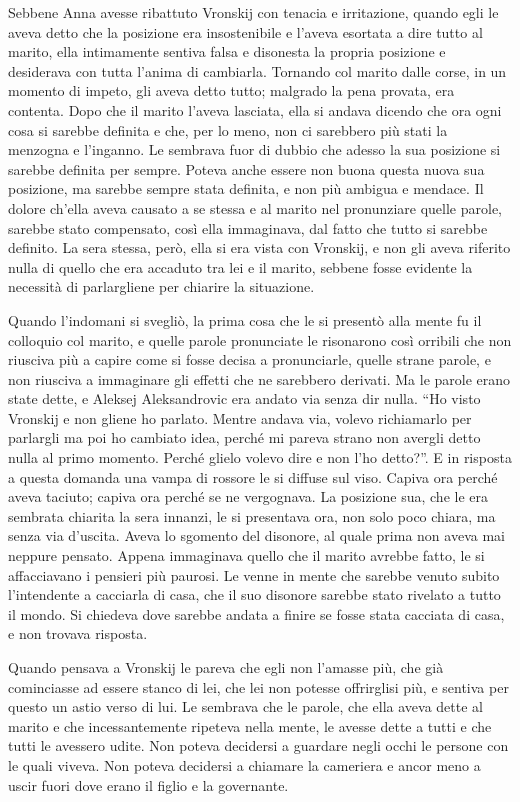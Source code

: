 Sebbene Anna avesse ribattuto Vronskij con tenacia e irritazione, quando egli le aveva detto che la posizione era insostenibile e l'aveva esortata a dire tutto al marito, ella intimamente sentiva falsa e disonesta la propria posizione e desiderava con tutta l'anima di cambiarla. Tornando col marito dalle corse, in un momento di impeto, gli aveva detto tutto; malgrado la pena provata, era contenta. Dopo che il marito l'aveva lasciata, ella si andava dicendo che ora ogni cosa si sarebbe definita e che, per lo meno, non ci sarebbero più stati la menzogna e l'inganno. Le sembrava fuor di dubbio che adesso la sua posizione si sarebbe definita per sempre. Poteva anche essere non buona questa nuova sua posizione, ma sarebbe sempre stata definita, e non più ambigua e mendace. Il dolore ch'ella aveva causato a se stessa e al marito nel pronunziare quelle parole, sarebbe stato compensato, così ella immaginava, dal fatto che tutto si sarebbe definito. La sera stessa, però, ella si era vista con Vronskij, e non gli aveva riferito nulla di quello che era accaduto tra lei e il marito, sebbene fosse evidente la necessità di parlargliene per chiarire la situazione. 

Quando l'indomani si svegliò, la prima cosa che le si presentò alla mente fu il colloquio col marito, e quelle parole pronunciate le risonarono così orribili che non riusciva più a capire come si fosse decisa a pronunciarle, quelle strane parole, e non riusciva a immaginare gli effetti che ne sarebbero derivati. Ma le parole erano state dette, e Aleksej Aleksandrovic era andato via senza dir nulla. ``Ho visto Vronskij e non gliene ho parlato. Mentre andava via, volevo richiamarlo per parlargli ma poi ho cambiato idea, perché mi pareva strano non avergli detto nulla al primo momento. Perché glielo volevo dire e non l'ho detto?''. E in risposta a questa domanda una vampa di rossore le si diffuse sul viso. Capiva ora perché aveva taciuto; capiva ora perché se ne vergognava. La posizione sua, che le era sembrata chiarita la sera innanzi, le si presentava ora, non solo poco chiara, ma senza via d'uscita. Aveva lo sgomento del disonore, al quale prima non aveva mai neppure pensato. Appena immaginava quello che il marito avrebbe fatto, le si affacciavano i pensieri più paurosi. Le venne in mente che sarebbe venuto subito l'intendente a cacciarla di casa, che il suo disonore sarebbe stato rivelato a tutto il mondo. Si chiedeva dove sarebbe andata a finire se fosse stata cacciata di casa, e non trovava risposta. 

Quando pensava a Vronskij le pareva che egli non l'amasse più, che già cominciasse ad essere stanco di lei, che lei non potesse offrirglisi più, e sentiva per questo un astio verso di lui. Le sembrava che le parole, che ella aveva dette al marito e che incessantemente ripeteva nella mente, le avesse dette a tutti e che tutti le avessero udite. Non poteva decidersi a guardare negli occhi le persone con le quali viveva. Non poteva decidersi a chiamare la cameriera e ancor meno a uscir fuori dove erano il figlio e la governante. 

